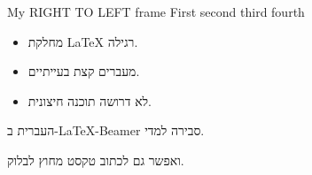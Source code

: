 		\begin{frame}{My RIGHT TO LEFT frame}
			\setRTL
		 	First second third fourth	
		\end{frame}

	

    
    \begin{hframe}
    \end{hframe}
    
    
    \begin{hframe}
      \begin{itemize}
      \item<1->  מחלקת LaTeX רגילה.
      \item<2-> מעברים קצת בעייתיים.
      \item<3-> לא דרושה תוכנה חיצונית.      
      \end{itemize}
    \end{hframe}
    
    \begin{hframe}
    \begin{hclaim}
    העברית ב-\LaTeX-Beamer סבירה למדי.
    \end{hclaim}
    ואפשר גם לכתוב טקסט מחוץ לבלוק.
    \end{hframe}
    
    
